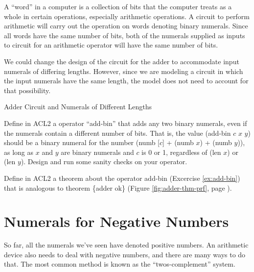 \begin{aside}
A ``word'' in a computer is a collection of bits
that the computer treats as a whole in certain operations,
especially arithmetic operations.
A circuit to perform arithmetic will carry out
the operation on words denoting binary numerals.
Since all words have the same number of bits,
both of the numerals supplied as inputs to circuit
for an arithmetic operator will have the same number of bits.

We could change the design of the circuit for the adder
to accommodate input numerals of differing lengths.
However, since we are modeling a circuit
in which the input numerals have the same length,
the model does not need to account for that possibility.
\caption{Adder Circuit and Numerals of Different Lengths}
\label{adder-circuit-and-numerals-of-different-lengths}
\end{aside}

\begin{ExerciseList}
\Exercise \label{ex:add-bin}
Define in ACL2 a operator ``add-bin''
that adds any two binary numerals,
even if the numerals contain a different number of bits.
That is, the value (add-bin $c$ $x$ $y$) should be a binary numeral
for the number (numb [$c$] + (numb $x$) + (numb $y$)),
as long as $x$ and $y$ are binary numerals and $c$ is 0 or 1,
regardless of (len $x$) or (len $y$).
Design and run some sanity checks on your operator.

\Exercise Define in ACL2 a theorem about the operator add-bin (Excercise \ref{ex:add-bin})
that is analogous to theorem \{adder ok\}
(Figure \ref{fig:adder-thm-prf}, page \pageref{fig:adder-thm-prf}).

\end{ExerciseList}

\section{Numerals for Negative Numbers}
\label{sec:negative-numerals}

So far, all the numerals we've seen have denoted positive numbers.
An arithmetic device also needs to deal with negative numbers,
and there are many ways to do that.
The most common method is known as the
``twos-complement'' system.


